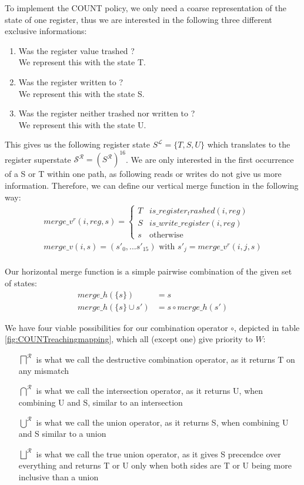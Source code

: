 To implement the COUNT policy, we only need a coarse representation of the state of one register, thus we are interested in the following three different exclusive informations:
\begin{enumerate}
\item Was the register value trashed ? \\ We represent this with the state T.
\item Was the register written to ? \\ We represent this with the state S.
\item Was the register neither trashed nor written to ? \\ We represent this with the state U.
\end{enumerate}
This gives us the following register state $S^\mathcal{L} = \{ T, S, U \}$ which translates to the register superstate $\mathcal{S}^\mathcal{R} = (S^\mathcal{R})^{16}$.
We are only interested in the first occurrence of a S or T within one path, as following reads or writes do not give us more information.
Therefore, we can define our vertical merge function in the following way:
\begin{align}
merge\_v^{r} (i, reg, s) = \left\{
  \begin{array}{lr}
    T & is\_register_trashed(i, reg)\\
    S & is\_write\_register(i, reg)\\
    s & \text{otherwise}
  \end{array}
\right. \\
merge\_v (i, s) = (s'_0, ... s'_15) \text { with } s'_j = merge\_v^{r}(i, j, s)\\
\end{align}

Our horizontal merge function is a simple pairwise combination of the given set of states:
\begin{align}
merge\_h(\{s\}) &= s\\
merge\_h(\{s\} \cup s') &= s \circ merge\_h(s')
\end{align}

We have four viable possibilities for our combination operator $\circ$, depicted in table \ref{fig:COUNTreachingmapping}, which all (except one) give priority to $W$:
\begin{itemize}
\item [$\bigsqcap^{\mathcal{R}}$] is what we call the destructive combination operator, as it returns T on any mismatch
\item [$\bigcap^{\mathcal{R}}$] is what we call the intersection operator, as it returns U, when combining U and S, similar to an intersection
\item [$\bigcup^{\mathcal{R}}$] is what we call the union operator, as it returns S, when combining U and S similar to a union
\item [$\bigsqcup^{\mathcal{R}}$] is what we call the true union operator, as it gives S precendce over everything and returns T or U only when both sides are T or U being more inclusive than a union
\end{itemize}

